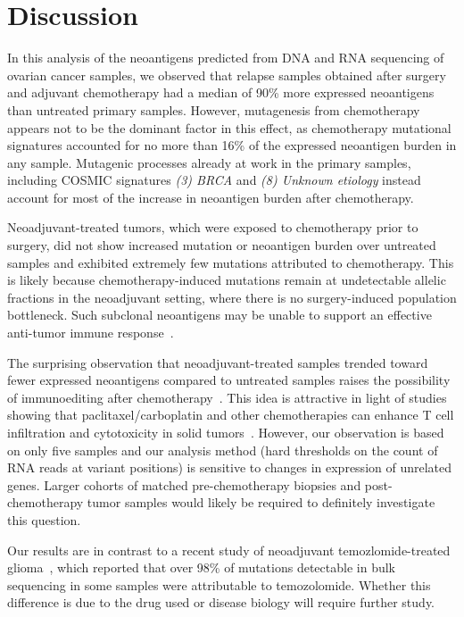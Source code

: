 \section*{Discussion}
In this analysis of the neoantigens predicted from DNA and RNA sequencing of ovarian cancer samples, we observed that relapse samples obtained after surgery and adjuvant chemotherapy had a median of 90\% more expressed neoantigens than untreated primary samples. However, mutagenesis from chemotherapy appears not to be the dominant factor in this effect, as chemotherapy mutational signatures accounted for no more than 16\% of the expressed neoantigen burden in any sample. Mutagenic processes already at work in the primary samples, including COSMIC signatures \textit{(3) BRCA} and \textit{(8) Unknown etiology} instead account for most of the increase in neoantigen burden after chemotherapy.

Neoadjuvant-treated tumors, which were exposed to chemotherapy prior to surgery, did not show increased mutation or neoantigen burden over untreated samples and exhibited extremely few mutations attributed to chemotherapy. This is likely because chemotherapy-induced mutations remain at undetectable allelic fractions in the neoadjuvant setting, where there is no surgery-induced population bottleneck. Such subclonal neoantigens may be unable to support an effective anti-tumor immune response~\cite{McGranahan_2016}.

The surprising observation that neoadjuvant-treated samples trended toward fewer expressed neoantigens compared to untreated samples raises the possibility of immunoediting after chemotherapy~\cite{Dunn_2002}. This idea is attractive in light of studies showing that paclitaxel/carboplatin and other chemotherapies can enhance T cell infiltration and cytotoxicity in solid tumors~\cite{Demaria2001,Wu_2009,Pfannenstiel_2010,Hodge_2013}. However, our observation is based on only five samples and our analysis method (hard thresholds on the count of RNA reads at variant positions) is sensitive to changes in expression of unrelated genes. Larger cohorts of matched pre-chemotherapy biopsies and post-chemotherapy tumor samples would likely be required to definitely investigate this question.

Our results are in contrast to a recent study of neoadjuvant temozlomide-treated glioma~\cite{Johnson_2013}, which reported that over 98\% of mutations detectable in bulk sequencing in some samples were attributable to temozolomide. Whether this difference is due to the drug used or disease biology will require further study.

